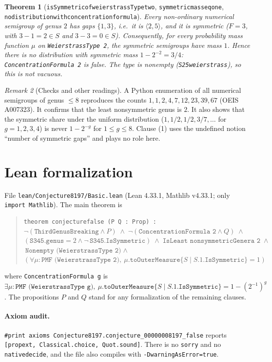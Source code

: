 \documentclass[11pt]{article}
\newtheorem{theorem}{Theorem}
\theoremstyle{definition}
\theoremstyle{remark}
\newtheorem{remark}[theorem]{Remark}
\renewcommand{\_}{\oldus\allowbreak}
\begin{document}
\begin{theorem}[\texttt{isSymmetric\_of\_weierstrassType\_two}, \texttt{symmetric\_mass\_eq\_one},
\texttt{no\_distribution\_with\_concentration\_formula}]\label{thm:conc}
Every non-ordinary numerical semigroup of genus $2$ has gaps $\{1,3\}$, i.e.\ it is $\langle 2,5\rangle$,
and it is symmetric ($F = 3$, with $3-1 = 2 \in S$ and $3-3 = 0\in S$). Consequently, for every probability
mass function $\mu$ on \texttt{WeierstrassType 2}, the symmetric semigroups have mass $1$. Hence there is no
distribution with symmetric mass $1 - 2^{-2} = 3/4$: \texttt{ConcentrationFormula 2} is false. The type is
nonempty (\texttt{S25\_weierstrass}), so this is not vacuous.
\end{theorem}

\begin{remark}[Checks and other readings]
A Python enumeration of all numerical semigroups of genus $\le 8$ reproduces the counts
$1,1,2,4,7,12,23,39,67$ (OEIS A007323). It confirms that the least nonsymmetric genus is $2$. It also shows
that the symmetric share under the uniform distribution ($1, 1/2, 1/2, 3/7, \dots$ for $g = 1,2,3,4$) is
never $1-2^{-g}$ for $1 \le g \le 8$. Clause (1) uses the undefined notion ``number of symmetric gaps'' and
plays no role here.
\end{remark}

\section{Lean formalization}

File \texttt{lean/Conjecture8197/Basic.lean} (Lean 4.33.1, Mathlib v4.33.1; only \texttt{import Mathlib}).
The main theorem is
\begin{quote}
\texttt{theorem conjecture\_00000008197\_false (P Q : Prop) :}\\
\quad $\neg(\texttt{ThirdGenusBreaking} \wedge P) \;\wedge\; \neg(\texttt{ConcentrationFormula 2} \wedge Q)
\;\wedge$\\
\quad $(\texttt{S345.genus} = 2 \wedge \neg\,\texttt{S345.IsSymmetric}) \;\wedge\;
\texttt{IsLeast nonsymmetricGenera 2} \;\wedge$\\
\quad $\texttt{Nonempty (WeierstrassType 2)} \;\wedge$\\
\quad $(\forall \mu : \texttt{PMF (WeierstrassType 2)},\ \mu.\texttt{toOuterMeasure}
\{S \mid S.1.\texttt{IsSymmetric}\} = 1)$
\end{quote}
where \texttt{ConcentrationFormula g} is
$\exists \mu : \texttt{PMF (WeierstrassType g)},\ \mu.\texttt{toOuterMeasure}\{S \mid
S.1.\texttt{IsSymmetric}\} = 1 - (2^{-1})^{g}$. The propositions $P$ and $Q$ stand for any formalization of
the remaining clauses.

\paragraph{Axiom audit.} \verb|#print axioms Conjecture8197.conjecture_00000008197_false| reports
\texttt{[propext, Classical.choice, Quot.sound]}. There is no \texttt{sorry} and no
\texttt{native\_decide}, and the file also compiles with \texttt{-DwarningAsError=true}.
\end{document}
